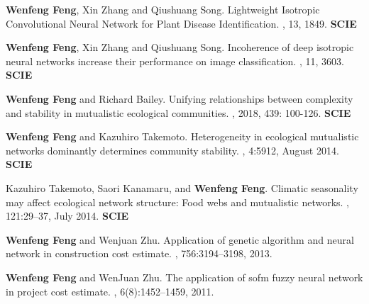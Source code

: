 \documentclass[11pt,a4paper,sans]{moderncv}        %
\begin{document}
\renewcommand{\bibliographyitemlabel}{{\arabic{enumiv}}}
\nocite{*}
\begin{thebibliography}{10}

\textbf{Wenfeng Feng}, Xin Zhang and Qiushuang Song.
\newblock Lightweight Isotropic Convolutional Neural Network for Plant Disease Identification.
, 13, 1849. \textbf{SCIE}
  
\textbf{Wenfeng Feng}, Xin Zhang and Qiushuang Song.
\newblock Incoherence of deep isotropic neural networks increase their performance on image classification.
, 11, 3603. \textbf{SCIE}

\textbf{Wenfeng Feng} and Richard Bailey.
\newblock Unifying relationships between complexity and stability in mutualistic ecological communities.
, 2018, 439: 100-126. \textbf{SCIE}

\textbf{Wenfeng Feng} and Kazuhiro Takemoto.
\newblock Heterogeneity in ecological mutualistic networks dominantly
  determines community stability.
, 4:5912, August 2014. \textbf{SCIE}

Kazuhiro Takemoto, Saori Kanamaru, and \textbf{Wenfeng Feng}.
\newblock Climatic seasonality may affect ecological network structure: Food
  webs and mutualistic networks.
, 121:29--37, July 2014. \textbf{SCIE}

\textbf{Wenfeng Feng} and Wenjuan Zhu.
\newblock Application of genetic algorithm and neural network in construction
  cost estimate.
, 756:3194--3198, 2013.


\textbf{Wenfeng Feng} and WenJuan Zhu.
\newblock The application of sofm fuzzy neural network in project cost
  estimate.
, 6(8):1452--1459, 2011.


\end{thebibliography}
\end{document}
